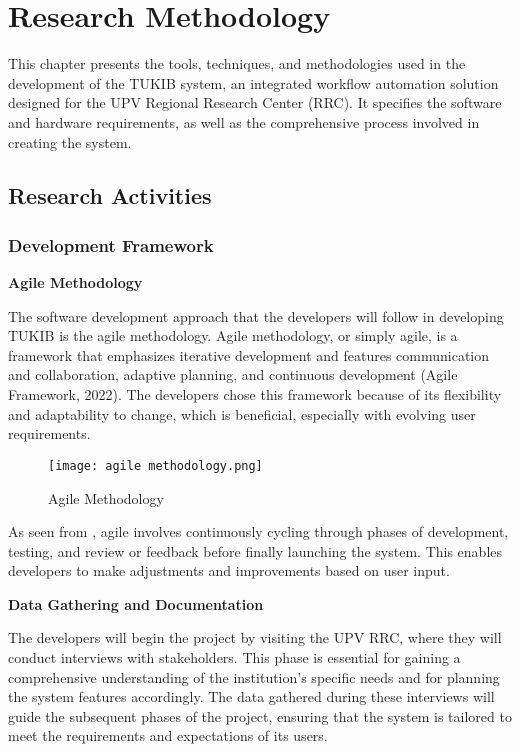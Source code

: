 \chapter{Research Methodology}
This chapter presents the tools, techniques, and methodologies used in the development of the TUKIB system, an integrated workflow automation solution designed for the UPV Regional Research Center (RRC). It specifies the software and hardware requirements, as well as the comprehensive process involved in creating the system.

\section{Research Activities}

\subsection{Development Framework}

\textbf{Agile Methodology}

The software development approach that the developers will follow in developing TUKIB is the agile methodology. Agile methodology, or simply agile, is a framework that emphasizes iterative development and features communication and collaboration, adaptive planning, and continuous development (Agile Framework, 2022). The developers chose this framework because of its flexibility and adaptability to change, which is beneficial, especially with evolving user requirements. 

\begin{figure}[h]
	\centering 
	\texttt{[image: agile methodology.png]}
	\caption{Agile Methodology}
	\label{fig:agile}
\end{figure}

As seen from , agile involves continuously cycling through phases of development, testing, and review or feedback before finally launching the system. This enables developers to make adjustments and improvements based on user input. 

\noindent\textbf{Data Gathering and Documentation}
	
The developers will begin the project by visiting the UPV RRC, where they will conduct interviews with stakeholders. This phase is essential for gaining a comprehensive understanding of the institution's specific needs and for planning the system features accordingly. The data gathered during these interviews will guide the subsequent phases of the project, ensuring that the system is tailored to meet the requirements and expectations of its users. 

